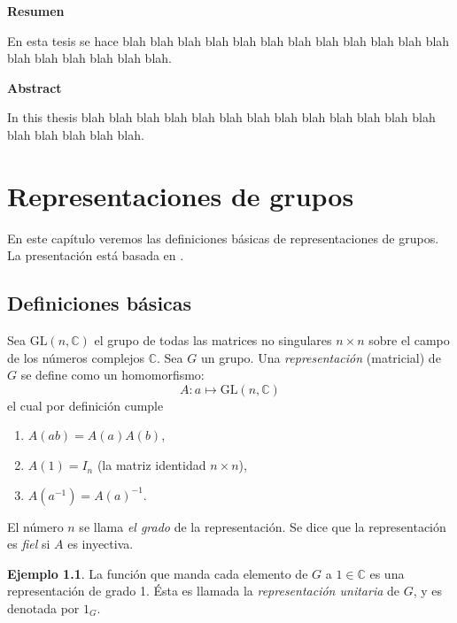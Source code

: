 \documentclass[12pt]{book}
\theoremstyle{definition}
\newtheorem{example}[theorem]{Ejemplo}
\newcounter{in}
\newcounter{ini}
\begin{document}
\thispagestyle{empty}
\begin{flushleft}
  {\bfseries\Large Resumen}
\end{flushleft}

En esta tesis se hace blah blah blah blah blah blah blah blah blah
blah blah blah blah blah blah blah blah blah.

\vspace{2cm}

\begin{flushleft}
  {\bfseries\Large Abstract}
\end{flushleft}

In this thesis blah blah blah blah blah blah blah blah blah
blah blah blah blah blah blah blah blah blah.

 \newpage \thispagestyle{empty}

\chapter{Representaciones de grupos}
\label{cha:Representaciones de grupos}

En este capítulo veremos las definiciones básicas de representaciones
de grupos. La presentación está basada en \cite{MR882540}.

\section{Definiciones básicas}
\label{sec:basicas}

Sea $ \mathrm{GL}(n,\mathbb{C})$ el grupo de todas las matrices no
singulares $n\times n$ sobre el campo de los números complejos
$\mathbb{C}$. Sea $G$ un grupo. Una \emph{representación} (matricial) de $G$
se define como un homomorfismo:
\begin{equation*}
  A \colon a \mapsto \mathrm{GL}(n,\mathbb{C})
\end{equation*}
el cual por definición cumple
\begin{enumerate}
\item $A\left(ab\right)=A\left(a\right)A\left(b\right)$,
\item $A\left(1\right)=I_{n}$ (la matriz identidad $n\times n$),
\item $A\left(a^{-1}\right)=A\left(a\right)^{-1}$.
\end{enumerate}
El número $n$ se llama \emph{el grado} de la representación. Se dice que la
representación es \emph{fiel} si $A$ es inyectiva.

\begin{example}
  \label{Ej6}
  La función que manda cada elemento de $G$ a $1
  \in \mathbb{C}$ es una representación de grado 1. Ésta es llamada la
  \emph{representación unitaria} de $G$, y es denotada por $1_{G}$. 
\end{example}
 
\end{document}

